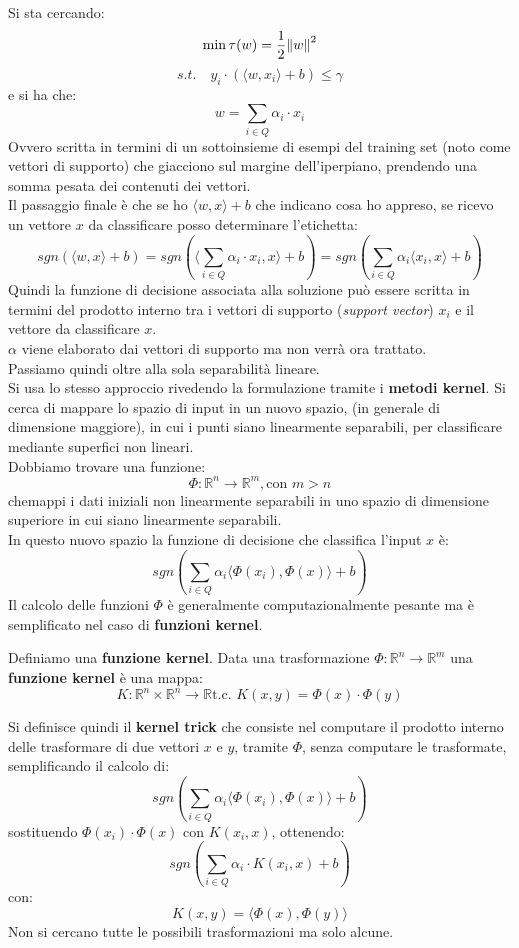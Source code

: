 Si sta cercando:
\[\min \tau(w)=\frac{1}{2}\norm{w}^2\]
\[s.t.\quad y_i\cdot(\langle w,x_i\rangle+b)\leq \gamma\]
e si ha che:
\[w=\sum_{i\in Q}\alpha_i\cdot x_i\]
Ovvero scritta in termini di un sottoinsieme di esempi del training set (noto
come vettori di supporto) che giacciono sul margine dell’iperpiano, prendendo
una somma pesata dei contenuti dei vettori.\\
Il passaggio finale è che se ho $\langle w,x\rangle+b$ che indicano cosa ho
appreso, se ricevo un vettore $x$ da classificare posso determinare l'etichetta:
\[sgn(\langle w,x\rangle+b)=sgn\left(\Big\langle\sum_{i\in Q}\alpha_i\cdot
    x_i,x\Big\rangle +b\right)=sgn\left(\sum_{i\in Q}\alpha_i\langle x_i,x\rangle
    +b\right)\]
Quindi la funzione di decisione associata alla soluzione può essere scritta in
termini del prodotto interno tra i vettori di supporto (\textit{support vector})
$x_i$ e il vettore da classificare $x$.\\
$\alpha$ viene elaborato dai vettori di supporto ma non verrà ora trattato.\\
Passiamo quindi oltre alla sola separabilità lineare.\\
Si usa lo stesso approccio rivedendo la formulazione tramite i \textbf{metodi
  kernel}. Si cerca di mappare lo spazio di input in un nuovo spazio, (in
generale di dimensione maggiore), in cui i punti siano linearmente separabili,
per classificare mediante superfici non lineari.\\
Dobbiamo trovare una funzione:
\[\Phi:\mathbb{R}^n\to \mathbb{R}^m,\mbox{con }m>n\]
chemappi i dati iniziali non linearmente separabili in uno spazio di dimensione
superiore in cui siano linearmente separabili.\\
In questo nuovo spazio la funzione di decisione che classifica l'input $x$ è:
\[sgn\left(\sum_{i\in Q}\alpha_i\langle \Phi(x_i),\Phi(x)\rangle+b\right)\]
Il calcolo delle funzioni $\Phi$ è generalmente computazionalmente pesante ma è
semplificato nel caso di \textbf{funzioni kernel}.
\begin{definizione}
  Definiamo una \textbf{funzione kernel}. Data una trasformazione
  $\Phi:\mathbb{R}^n\to \mathbb{R}^m$ una \textbf{funzione kernel} è una mappa:
  \[K:\mathbb{R}^n\times \mathbb{R}^n\to \mathbb{R}\mbox{
      t.c. }K(x,y)=\Phi(x)\cdot \Phi(y)\]
\end{definizione}
\begin{definizione}
  Si definisce quindi il \textbf{kernel trick} che consiste nel computare il
  prodotto interno delle trasformare di due vettori $x$ e $y$, tramite $\Phi$,
  senza computare le trasformate, semplificando il calcolo di:
  \[sgn\left(\sum_{i\in Q}\alpha_i\langle \Phi(x_i),\Phi(x)\rangle+b\right)\]
  sostituendo $\Phi(x_i)\cdot\Phi(x)$ con $K(x_i,x)$, ottenendo:
  \[sgn\left(\sum_{i\in Q}\alpha_i\cdot K(x_i,x)+b\right)\]
  con:
  \[K(x,y)=\langle \Phi(x),\Phi(y)\rangle\]
  Non si cercano tutte le possibili trasformazioni ma solo alcune.
\end{definizione}
